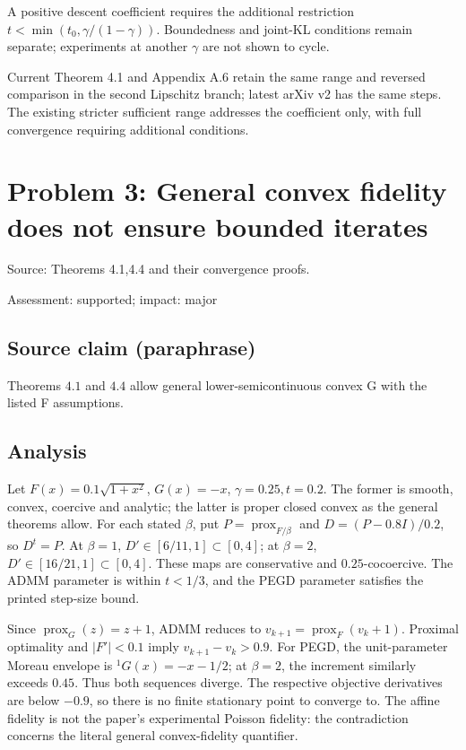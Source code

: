 \documentclass[11pt]{article}
\begin{document}
A positive descent coefficient requires the additional restriction \(t<\min(t_0,\gamma/(1-\gamma))\). Boundedness and joint-KL conditions remain separate; experiments at another \(\gamma\) are not shown to cycle.

Current Theorem 4.1 and Appendix A.6 retain the same range and reversed comparison in the second Lipschitz branch; latest arXiv v2 has the same steps. The existing stricter sufficient range addresses the coefficient only, with full convergence requiring additional conditions.

\section*{Problem 3: General convex fidelity does not ensure bounded iterates}

Source: Theorems 4.1,4.4 and their convergence proofs.

Assessment: supported; impact: major

\subsection*{Source claim (paraphrase)}

Theorems \(4.1\) and \(4.4\) allow general lower-semicontinuous convex G with the listed F assumptions.

\subsection*{Analysis}

Let \(F(x)=0.1\sqrt{1+x^2}\), \(G(x)=-x\), \(\gamma=0.25,t=0.2\). The former is smooth, convex, coercive and analytic; the latter is proper closed convex as the general theorems allow. For each stated \(\beta\), put \(P=\operatorname{prox}_{F/\beta}\) and \(D=(P-0.8I)/0.2\), so \(D^t=P\). At \(\beta=1\), \(D'\in[6/11,1]\subset[0,4]\); at \(\beta=2\), \(D'\in[16/21,1]\subset[0,4]\). These maps are conservative and \(0.25\)-cocoercive. The ADMM parameter is within \(t<1/3\), and the PEGD parameter satisfies the printed step-size bound.

Since \(\operatorname{prox}_G(z)=z+1\), ADMM reduces to \(v_{k+1}=\operatorname{prox}_F(v_k+1)\). Proximal optimality and \(|F'|<0.1\) imply \(v_{k+1}-v_k>0.9\). For PEGD, the unit-parameter Moreau envelope is \({}^1G(x)=-x-1/2\); at \(\beta=2\), the increment similarly exceeds \(0.45\). Thus both sequences diverge. The respective objective derivatives are below \(-0.9\), so there is no finite stationary point to converge to. The affine fidelity is not the paper’s experimental Poisson fidelity: the contradiction concerns the literal general convex-fidelity quantifier.
\end{document}

